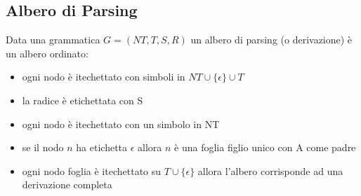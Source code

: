 \documentclass[a4paper,12pt]{article}
\begin{document}
\subsection{Albero di Parsing}
Data una grammatica $G=(NT,T,S,R)$ un albero di parsing (o derivazione) è un albero ordinato:
\begin{itemize}
  \item ogni nodo è itechettato con simboli in $NT \cup \{\epsilon\} \cup T$
  \item la radice è etichettata con S
  \item ogni nodo è itechettato con un simbolo in NT
  \item se il nodo $n$ ha etichetta $\epsilon$ allora $n$ è una foglia figlio unico con A come padre
  \item ogni nodo foglia è itechettato su $T \cup \{\epsilon\}$ allora l'albero corrisponde ad una derivazione completa
\end{itemize}
\end{document}
